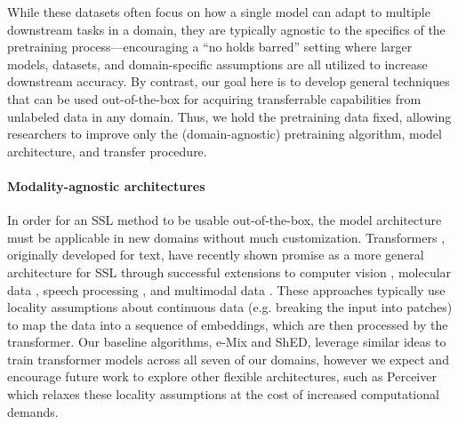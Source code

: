 \documentclass{article}
\begin{document}
While these datasets often focus on how a single model can adapt to multiple downstream tasks in a domain, they are typically agnostic to the specifics of the pretraining process---encouraging a ``no holds barred'' setting where larger models, datasets, and domain-specific assumptions are all utilized to increase downstream accuracy. By contrast, our goal here is to develop general techniques that can be used out-of-the-box for acquiring transferrable capabilities from unlabeled data in any domain. Thus, we hold the pretraining data fixed, allowing researchers to improve only the (domain-agnostic) pretraining algorithm, model architecture, and transfer procedure. 


\paragraph{Modality-agnostic architectures}
In order for an SSL method to be usable out-of-the-box, the model architecture must be applicable in new domains without much customization. Transformers \citep{Vaswani2017AttentionIA}, originally developed for text, have recently shown promise as a more general architecture for SSL through successful extensions to computer vision \citep{Dosovitskiy2020AnII}, molecular data \citep{Schwaller2019MolecularTA, rothchild2021c5t5}, speech processing \citep{Gong2021ASTAS},  and multimodal data \citep{Lu2019ViLBERTPT, Tan2019LXMERTLC, Chen2020UNITERUI}. These approaches typically use locality assumptions about continuous data (e.g. breaking the input into patches) to map the data into a sequence of embeddings, which are then processed by the transformer. Our baseline algorithms, e-Mix and ShED, leverage similar ideas to train transformer models across all seven of our domains, however we expect and encourage future work to explore other flexible architectures, such as Perceiver \citep{Jaegle2021PerceiverGP} which relaxes these locality assumptions at the cost of increased computational demands.
\end{document}
